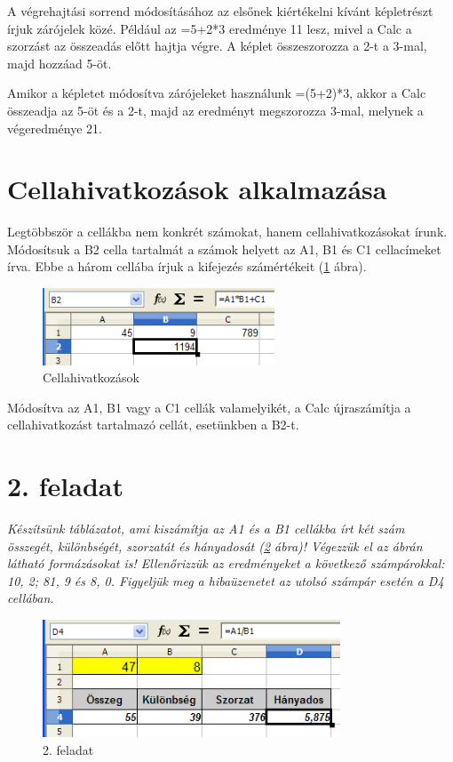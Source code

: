 A végrehajtási sorrend módosításához az elsőnek
kiértékelni kívánt képletrészt írjuk zárójelek
közé. Például az =5+2*3 eredménye 11 lesz, mivel a Calc a
szorzást az összeadás előtt hajtja végre. A képlet
összeszorozza a 2-t a 3-mal, majd hozzáad 5-öt.

Amikor a képletet módosítva zárójeleket használunk =(5+2)*3,
akkor a Calc összeadja az 5-öt és a 2-t, majd az eredményt
megszorozza 3-mal, melynek a végeredménye 21.

\section{Cellahivatkozások alkalmazása}

Legtöbbször a cellákba nem konkrét számokat, hanem
cellahivatkozásokat írunk. Módosítsuk a B2 cella tartalmát a
számok helyett az A1, B1 és C1 cellacímeket írva. Ebbe a
három cellába írjuk a kifejezés számértékeit (\ref{Cellahivatkozások}
ábra).

\begin{figure}[!h]
\begin{center}
\includegraphics[width=6.909cm]{oocalcv1-img21.png}
\caption{Cellahivatkozások}\label{Cellahivatkozások}
\end{center}
\end{figure}
Módosítva az A1, B1 vagy a C1 cellák valamelyikét, a Calc
újraszámítja a cellahivatkozást tartalmazó cellát,
esetünkben a B2-t.

\section{2. feladat}
{\itshape
Készítsünk táblázatot, ami kiszámítja az A1 és a B1
cellákba írt két szám összegét, különbségét,
szorzatát és hányadosát (\ref{2-feladat} ábra)! Végezzük el az
ábrán látható formázásokat is! Ellenőrizzük az
eredményeket a következő számpárokkal: 10, 2; 81, 9 és 8,
0. Figyeljük meg a hibaüzenetet az utolsó számpár esetén a
D4 cellában. }


\begin{figure}[!h]
\begin{center}
\includegraphics[width=8.867cm]{oocalcv1-img22.png}
\caption{2. feladat}\label{2-feladat}
\end{center}
\end{figure}
